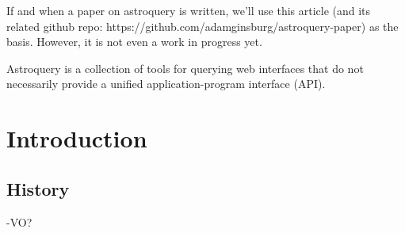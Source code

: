 If and when a paper on astroquery is written, we'll use this article (and its
related github repo: https://github.com/adamginsburg/astroquery-paper) as the
basis.  However, it is not even a work in progress yet.


Astroquery is a collection of tools for querying web interfaces that do not
necessarily provide a unified application-program interface (API).


\section{Introduction}
\subsection{History}
-VO?
